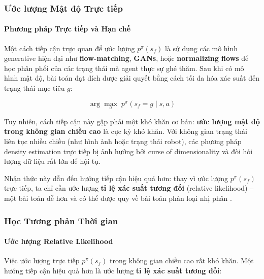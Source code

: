 \subsubsection{Ước lượng Mật độ Trực tiếp}

\paragraph{Phương pháp Trực tiếp và Hạn chế}

Một cách tiếp cận trực quan để ước lượng $p^\pi(s_f)$ là sử dụng các
mô hình generative hiện đại như \textbf{flow-matching}, \textbf{GANs},
hoặc \textbf{normalizing flows} để học phân phối của các trạng thái mà
agent thực sự ghé thăm. Sau khi có mô hình mật độ, bài toán
đạt đích được giải quyết bằng cách tối đa hóa xác suất đến trạng
thái mục tiêu $g$:

\begin{equation}
    \arg\max_a \; p^\pi(s_f = g \mid s, a)
    \label{eq:direct_density}
\end{equation}

Tuy nhiên, cách tiếp cận này gặp phải một khó khăn cơ bản:
\textbf{ước lượng mật độ trong không gian chiều cao} là cực kỳ khó
khăn. Với không gian trạng thái liên tục nhiều chiều (như hình ảnh
hoặc trạng thái robot), các phương pháp density estimation trực tiếp
bị ảnh hưởng bởi curse of dimensionality và đòi hỏi lượng dữ liệu
rất lớn để hội tụ.

Nhận thức này dẫn đến hướng tiếp cận hiệu quả hơn: thay vì ước lượng
$p^\pi(s_f)$ trực tiếp, ta chỉ cần ước lượng \textbf{tỉ lệ xác suất
tương đối} (relative likelihood) -- một bài toán dễ hơn và có thể
được quy về bài toán phân loại nhị phân
\cite{eysenbach2025generativerl}.

\subsubsection{Học Tương phản Thời gian}

\paragraph{Ước lượng Relative Likelihood}

Việc ước lượng trực tiếp $p^\pi(s_f)$ trong không gian chiều cao rất
khó khăn. Một hướng tiếp cận hiệu quả hơn là ước lượng
\textbf{tỉ lệ xác suất tương đối}:

